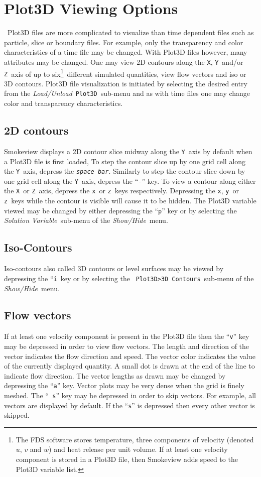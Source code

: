 \documentclass[11pt,twoside]{book}
\begin{document}
\section{Plot3D Viewing Options}\ Plot3D files are more
complicated to visualize than time dependent files such as
particle, slice or boundary files. For example, only the
transparency and color characteristics of a time file may be
changed. With Plot3D files however, many attributes may be
changed. One may view 2D contours along the {\tt X}, {\tt Y}\
and/or {\tt Z}\ axis of up to six\footnote{ The FDS software stores
temperature, three components of velocity (denoted $u$, $v$ and
$w$) and heat release per unit volume.  If at least one velocity
component is stored in a Plot3D file, then Smokeview adds speed to
the Plot3D variable list.}\ different simulated quantities, view
flow vectors and iso or 3D contours. Plot3D file visualization is
initiated by selecting the desired entry from the {\em
Load/Unload}\ {\tt Plot3D}\ sub-menu and as with time files one may
change color and transparency characteristics.

\subsection{2D contours}
Smokeview displays a 2D contour slice midway along the {\tt Y}\
axis by default when a Plot3D file is first loaded, To step the
contour slice up by one grid cell along the {\tt Y}\ axis, depress
the {\em\tt space bar}. Similarly to step the contour slice down
by one grid cell along the {\tt Y}\ axis, depress the ``{\tt -}''
key. To view a contour along either the {\tt X}\ or {\tt Z}\ axis,
depress the {\tt x}\ or {\tt z}\ keys respectively.  Depressing the
{\tt x}, {\tt y}\ or {\tt z}\ keys while the contour is visible will
cause it to be hidden. The Plot3D variable viewed may be changed
by either depressing the ``{\tt p}'' key or by selecting the {\em
Solution Variable}\ sub-menu of the {\em Show/Hide}\ menu.

\subsection{Iso-Contours}Iso-contours also called 3D contours or level surfaces may be
viewed by depressing the ``{\tt i}\ key or by selecting the {\tt
Plot3D>3D Contours}\ sub-menu of the {\em Show/Hide}\ menu.

\subsection{Flow vectors}If at least one velocity component is present in the Plot3D
file then the ``{\tt v}'' key may be depressed in order to view
flow  vectors. The length and direction of the vector indicates
the flow direction and speed. The vector color indicates the value
of the currently displayed quantity. A small dot is drawn at the
end of the line to indicate flow direction. The vector lengths as
drawn may be changed by depressing the ``{\tt a}'' key. Vector
plots may be very dense when the grid is finely meshed. The ``{\tt
s}'' key may be depressed in order to skip vectors.  For example,
all vectors are displayed by default.  If the ``{\tt s}'' is
depressed then every other vector is skipped.
\end{document}
